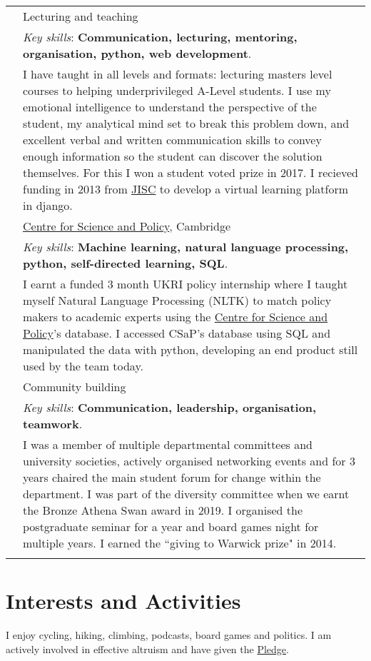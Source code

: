 \documentclass[a4paper,10pt]{article}
\newcommand{\tab}{\hspace{10 pt}}
\begin{document}
\begin{tabular}{p{2.25cm}|p{15cm}}
	 & \tab Lecturing and teaching\\
	 & \footnotesize{\emph{Key skills}: \textbf{Communication, lecturing, mentoring, organisation, python, web development}.}\\
	 &	\footnotesize{I have taught in all levels and formats: lecturing masters level courses to helping underprivileged A-Level students. I use my emotional intelligence to understand the perspective of the student, my analytical mind set to break this problem down, and excellent verbal and written communication skills to convey enough information so the student can discover the solution themselves. For this I won a student voted prize in 2017. I recieved funding in 2013 from \href{https://www.jisc.ac.uk/}{JISC} to develop a virtual learning platform in django.}\vspace{0.05 in}\\
	 & \tab \href{https://www.csap.cam.ac.uk/}{Centre for Science and Policy}, Cambridge\\
	 & \footnotesize{\emph{Key skills}: \textbf{Machine learning, natural language processing, python, self-directed learning, SQL}.}\\
	 &	\footnotesize{I earnt a funded 3 month UKRI policy internship where I taught myself Natural Language Processing (NLTK) to match policy makers to academic experts using the \href{https://www.csap.cam.ac.uk/}{Centre for Science and Policy}'s database. I accessed CSaP's database using SQL and manipulated the data with python, developing an end product still used by the team today.}\vspace{0.05 in}\\
	 & \tab Community building\\
	 & \footnotesize{\emph{Key skills}: \textbf{Communication, leadership, organisation, teamwork}.}\\
	 &	\footnotesize{I was a member of multiple departmental committees and university societies, actively organised networking events and for 3 years chaired the main student forum for change within the department. I was part of the diversity committee when we earnt the Bronze Athena Swan award in 2019. I organised the postgraduate seminar for a year and board games night for multiple years. I earned the ``giving to Warwick prize" in 2014.}\\
\multicolumn{2}{c}{} \\
\end{tabular}
\vspace{-0.5cm}

\section{Interests and Activities}
I enjoy cycling, hiking, climbing, podcasts, board games and politics. I am actively involved in effective altruism and have given the \href{https://www.givingwhatwecan.org/}{Pledge}.
\end{document}
